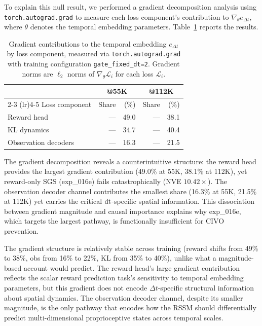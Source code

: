 To explain this null result, we performed a gradient decomposition analysis using \texttt{torch.autograd.grad} to measure each loss component's contribution to $\nabla_\theta e_{\Delta t}$, where $\theta$ denotes the temporal embedding parameters. Table~\ref{tab:gradient_decomposition} reports the results.

\begin{table}[ht]
\centering
\caption{Gradient contributions to the temporal embedding $e_{\Delta t}$ by loss component, measured via \texttt{torch.autograd.grad} with training configuration \texttt{gate\_fixed\_dt=2}. Gradient norms are $\ell_2$ norms of $\nabla_\theta \mathcal{L}_i$ for each loss $\mathcal{L}_i$.}
\label{tab:gradient_decomposition}
\small
\begin{tabular}{lrrrr}
\toprule
& \multicolumn{2}{c}{\textbf{@55K}} & \multicolumn{2}{c}{\textbf{@112K}} \\
\cmidrule(lr){2-3} \cmidrule(lr){4-5}
Loss component & Share & (\%) & Share & (\%) \\
\midrule
Reward head & --- & 49.0 & --- & 38.1 \\
KL dynamics & --- & 34.7 & --- & 40.4 \\
Observation decoders & --- & 16.3 & --- & 21.5 \\
\bottomrule
\end{tabular}
\end{table}

The gradient decomposition reveals a counterintuitive structure: the reward head provides the largest gradient contribution (49.0\% at 55K, 38.1\% at 112K), yet reward-only SGS (exp\_016e) fails catastrophically (NVE $10.42\times$). The observation decoder channel contributes the smallest share (16.3\% at 55K, 21.5\% at 112K) yet carries the critical $\mathrm{dt}$-specific spatial information.  This dissociation between gradient magnitude and causal importance explains why exp\_016e, which targets the largest pathway, is functionally insufficient for CIVO prevention.

The gradient structure is relatively stable across training (reward shifts from 49\% to 38\%, obs from 16\% to 22\%, KL from 35\% to 40\%), unlike what a magnitude-based account would predict. The reward head's large gradient contribution reflects the scalar reward prediction task's sensitivity to temporal embedding parameters, but this gradient does not encode $\Delta t$-specific structural information about spatial dynamics. The observation decoder channel, despite its smaller magnitude, is the only pathway that encodes how the RSSM should differentially predict multi-dimensional proprioceptive states across temporal scales.

